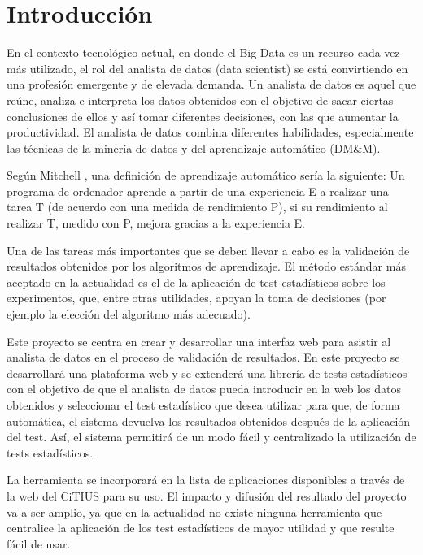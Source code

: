 \chapter{Introducción}
En el contexto tecnológico actual, en donde el Big Data es un recurso cada vez más
utilizado, el rol del analista de datos (data scientist) se está convirtiendo en una profesión
emergente y de elevada demanda. Un analista de datos es aquel que reúne, analiza e interpreta
los datos obtenidos con el objetivo de sacar ciertas conclusiones de ellos y así tomar diferentes
decisiones, con las que aumentar la productividad. El analista de datos combina diferentes
habilidades, especialmente las técnicas de la minería de datos y del aprendizaje automático (DM\&M).

Según Mitchell \cite{mitchell}, una definición de aprendizaje automático sería la siguiente: Un programa de
ordenador aprende a partir de una experiencia E a realizar una tarea T (de acuerdo con una medida
de rendimiento P), si su rendimiento al realizar T, medido con P, mejora gracias a la experiencia E.

Una de las tareas más importantes que se deben llevar a cabo es la validación de resultados
obtenidos por los algoritmos de aprendizaje. El método estándar más aceptado en la actualidad
es el de la aplicación de test estadísticos sobre los experimentos, que, entre otras utilidades,
apoyan la toma de decisiones (por ejemplo la elección del algoritmo más adecuado).

Este proyecto se centra en crear y desarrollar una interfaz web para asistir al analista de
datos en el proceso de validación de resultados. En este proyecto se desarrollará una plataforma web
y se extenderá una librería de tests estadísticos con el objetivo de que el analista de datos
pueda introducir en la web los datos obtenidos y seleccionar el test estadístico que desea
utilizar para que, de forma automática, el sistema devuelva los resultados obtenidos después de
la aplicación del test. Así, el sistema permitirá de un modo fácil y centralizado la utilización de
tests estadísticos.

La herramienta se incorporará en la lista de aplicaciones disponibles a través de la web del
CiTIUS para su uso. El impacto y difusión del resultado del proyecto va a ser amplio, ya que en la
actualidad no existe ninguna herramienta que centralice la aplicación de los test estadísticos de mayor
utilidad y que resulte fácil de usar.

